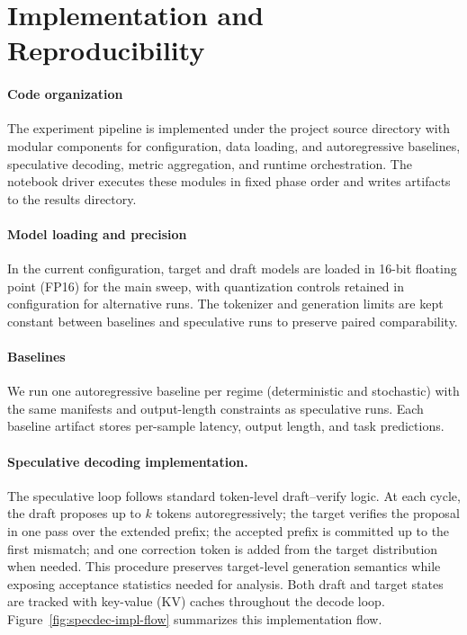 \section{Implementation and Reproducibility}
\label{sec:impl}

\paragraph{Code organization}
The experiment pipeline is implemented under the project source directory with
modular components for configuration, data loading, and autoregressive baselines,
speculative decoding, metric aggregation, and runtime orchestration.
The notebook driver executes these modules in fixed phase order and writes
artifacts to the results directory.

\paragraph{Model loading and precision}
In the current configuration, target and draft models are loaded in 16-bit
floating point (FP16) for
the main sweep, with quantization controls retained in configuration for
alternative runs. The tokenizer and generation limits are kept constant between
baselines and speculative runs to preserve paired comparability.

\paragraph{Baselines}
We run one autoregressive baseline per regime (deterministic and stochastic)
with the same manifests and output-length constraints as speculative runs.
Each baseline artifact stores per-sample latency, output length, and task
predictions.

\paragraph{Speculative decoding implementation.}
The speculative loop follows standard token-level draft--verify logic.
At each cycle, the draft proposes up to $k$ tokens autoregressively; the
target verifies the proposal in one pass over the extended prefix; the accepted
prefix is committed up to the first mismatch; and one correction token is added
from the target distribution when needed. This procedure preserves target-level
generation semantics while exposing acceptance statistics needed for analysis.
Both draft and target states are tracked with key-value (KV) caches throughout
the decode loop.
Figure~\ref{fig:specdec-impl-flow} summarizes this implementation flow.

